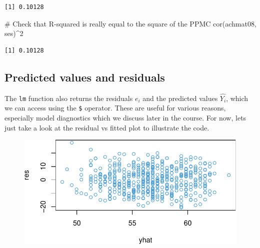 \documentclass[
  letterpaper,
  DIV=11,
  numbers=noendperiod]{scrreprt}
\newenvironment{Shaded}{\begin{snugshade}}{\end{snugshade}}
\newcommand{\AttributeTok}[1]{\textcolor[rgb]{0.40,0.45,0.13}{#1}}
\newcommand{\CommentTok}[1]{\textcolor[rgb]{0.37,0.37,0.37}{#1}}
\newcommand{\DecValTok}[1]{\textcolor[rgb]{0.68,0.00,0.00}{#1}}
\newcommand{\FunctionTok}[1]{\textcolor[rgb]{0.28,0.35,0.67}{#1}}
\newcommand{\NormalTok}[1]{\textcolor[rgb]{0.00,0.23,0.31}{#1}}
\newcommand{\OtherTok}[1]{\textcolor[rgb]{0.00,0.23,0.31}{#1}}
\newcommand{\SpecialCharTok}[1]{\textcolor[rgb]{0.37,0.37,0.37}{#1}}
\newcommand{\StringTok}[1]{\textcolor[rgb]{0.13,0.47,0.30}{#1}}
\begin{document}
\begin{verbatim}
[1] 0.10128
\end{verbatim}

\begin{Shaded}
\begin{Highlighting}[]
\CommentTok{\# Check that R{-}squared is really equal to the square of the PPMC}
\FunctionTok{cor}\NormalTok{(achmat08, ses)}\SpecialCharTok{\^{}}\DecValTok{2}
\end{Highlighting}
\end{Shaded}

\begin{verbatim}
[1] 0.10128
\end{verbatim}

\hypertarget{predicted-values-and-residuals}{%
\subsection{Predicted values and
residuals}\label{predicted-values-and-residuals}}

The \texttt{lm} function also returns the residuals \(e_i\) and the
predicted values \(\widehat{Y_i}\), which we can access using the
\texttt{\$} operator. These are useful for various reasons, especially
model diagnostics which we discuss later in the course. For now, lets
just take a look at the residual vs fitted plot to illustrate the code.

\begin{Shaded}
\end{Shaded}

\begin{figure}[H]

{\centering \includegraphics{ch2_simple_regression_files/figure-pdf/unnamed-chunk-19-1.pdf}

}

\end{figure}
\end{document}
